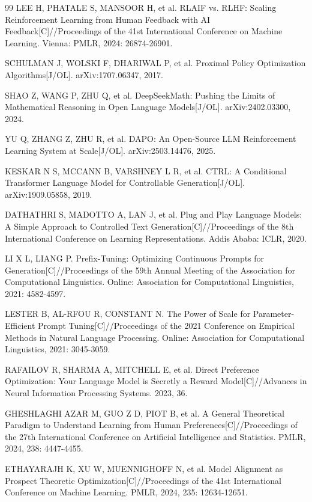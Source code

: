 \documentclass[fontset=fandol,type=master,campus=shenzhen,etitleauto=true]{hithesisbook}
\begin{document}
\begin{thebibliography}{99}
 LEE H, PHATALE S, MANSOOR H, et al. RLAIF vs. RLHF: Scaling Reinforcement Learning from Human Feedback with AI Feedback[C]//Proceedings of the 41st International Conference on Machine Learning. Vienna: PMLR, 2024: 26874-26901.

 SCHULMAN J, WOLSKI F, DHARIWAL P, et al. Proximal Policy Optimization Algorithms[J/OL]. arXiv:1707.06347, 2017.

 SHAO Z, WANG P, ZHU Q, et al. DeepSeekMath: Pushing the Limits of Mathematical Reasoning in Open Language Models[J/OL]. arXiv:2402.03300, 2024.

 YU Q, ZHANG Z, ZHU R, et al. DAPO: An Open-Source LLM Reinforcement Learning System at Scale[J/OL]. arXiv:2503.14476, 2025.

 KESKAR N S, MCCANN B, VARSHNEY L R, et al. CTRL: A Conditional Transformer Language Model for Controllable Generation[J/OL]. arXiv:1909.05858, 2019.

 DATHATHRI S, MADOTTO A, LAN J, et al. Plug and Play Language Models: A Simple Approach to Controlled Text Generation[C]//Proceedings of the 8th International Conference on Learning Representations. Addis Ababa: ICLR, 2020.

 LI X L, LIANG P. Prefix-Tuning: Optimizing Continuous Prompts for Generation[C]//Proceedings of the 59th Annual Meeting of the Association for Computational Linguistics. Online: Association for Computational Linguistics, 2021: 4582-4597.

 LESTER B, AL-RFOU R, CONSTANT N. The Power of Scale for Parameter-Efficient Prompt Tuning[C]//Proceedings of the 2021 Conference on Empirical Methods in Natural Language Processing. Online: Association for Computational Linguistics, 2021: 3045-3059.

 RAFAILOV R, SHARMA A, MITCHELL E, et al. Direct Preference Optimization: Your Language Model is Secretly a Reward Model[C]//Advances in Neural Information Processing Systems. 2023, 36.

 GHESHLAGHI AZAR M, GUO Z D, PIOT B, et al. A General Theoretical Paradigm to Understand Learning from Human Preferences[C]//Proceedings of the 27th International Conference on Artificial Intelligence and Statistics. PMLR, 2024, 238: 4447-4455.

 ETHAYARAJH K, XU W, MUENNIGHOFF N, et al. Model Alignment as Prospect Theoretic Optimization[C]//Proceedings of the 41st International Conference on Machine Learning. PMLR, 2024, 235: 12634-12651.


\end{thebibliography}
\end{document}
